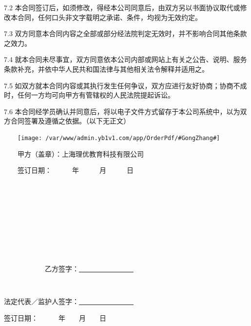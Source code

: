 \documentclass {ctexart}
\begin{document}
7.2	本合同签订后，如须修改，得经本公司同意后，由双方另以书面协议取代或修改本合同，任何口头非文字载明之承诺、条件，均视为无效约定。

7.3	双方同意本合同内容之全部或部分经法院判定无效时，并不影响合同其他条款之效力。

7.4	就本合同未尽事宜，双方同意依本公司内部或网站上有关之公告、说明、服务条款补充，并依中华人民共和国法律与其他相关法令解释并适用之。

7.5	如双方就本合同内容或其执行发生任何争议，双方应进行友好协商；协商不成时，任何一方均可向甲方有管辖权的人民法院提起诉讼。

7.6	本合同经学员确认并同意后，将以电子文件方式留存于本公司系统中，以为双方合同签署及遵循之依据。（以下无正文）


\begin{multicols}{2}

　　\texttt{[image: /var/www/admin.yb1v1.com/app/OrderPdf/\#GongZhang\#]}
 

 　　甲方（盖章）：上海理优教育科技有限公司

 　　签订日期：　　　年　　　月　　　日




　　　　



　　　　



　　　　
　　　　

　　　　
　　　　

　　　　

　　　　　　乙方签字：\underline{　　　　　　　　}




　　　　

法定代表／监护人签字：\underline{　　　　　　　　}

签订日期：　　　年　　月　　日 　　　　　

　　　　


\end{multicols}


\printindex
\end{document}
